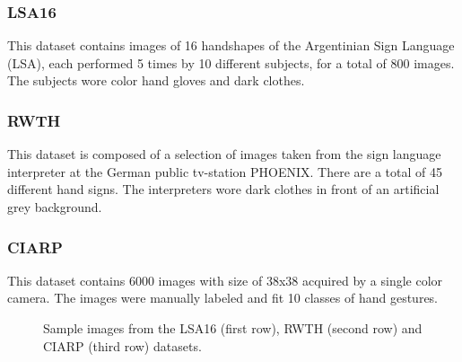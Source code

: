 
\subsubsection{LSA16}

This dataset contains images of 16 handshapes of the Argentinian Sign Language (LSA), each performed 5 times by 10 different subjects, for a total of 800 images. The subjects wore color hand gloves and dark clothes.

\subsubsection{RWTH}

This dataset is composed of a selection of images taken from the sign language interpreter at the German public tv-station PHOENIX. There are a total of 45 different hand signs. The interpreters wore dark clothes in front of an artificial grey background. 


\subsubsection{CIARP}

This dataset contains 6000 images with size of 38x38 acquired by a single color camera. The images were manually labeled and fit 10 classes of hand gestures. 

\begin{figure}
    \centering
    \caption{Sample images from the LSA16 (first row), RWTH (second row) and CIARP (third row) datasets.}
    \label{fig:datasets}
\end{figure}